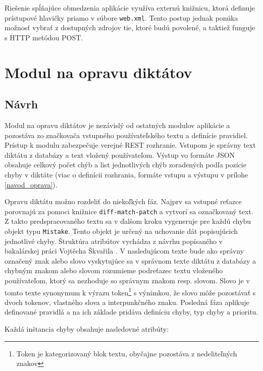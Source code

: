 \documentclass[12pt,oneside]{fithesis2}
\begin{document}
      		\par Riešenie spĺňajúce obmedzenia aplikácie využíva externú knižnicu\cite{dzhuvinov15}, ktorá definuje prístupové hlavičky priamo v súbore \texttt{web.xml}. Tento postup jednak ponúka možnosť vybrať z dostupných zdrojov tie, ktoré budú povolené, a taktiež funguje s HTTP metódou POST\cite{sof2}.
\pagebreak

      \chapter{Modul na opravu diktátov} \label{modul-diktaty}
      
      \section{Návrh}
      \par Modul na opravu diktátov je nezávislý od ostatných modulov aplikácie a pozostáva zo značkovača vstupného používateľského textu a definície pravidiel. Prístup k modulu zabezpečuje verejné REST rozhranie. Vstupom je správny text diktátu z databázy a text vložený používateľom. Výstup vo formáte JSON obsahuje celkový počet chýb a list jednotlivých chýb zoradených podľa pozície chyby v diktáte (viac o definícii rozhrania, formáte vstupu a výstupu v prílohe \ref{navod_oprava}). 
      \par Opravu diktátu možno rozdeliť do niekoľkých fáz. Najprv sa vstupné reťazce porovnajú za pomoci knižnice \texttt{diff-match-patch}\cite{diffmatchpatch} a vytvorí sa označkovaný text. Z takto predspracovaného textu sa v ďalšom kroku vygeneruje pre každú chybu objekt typu \texttt{Mistake}. Tento objekt je určený na uchovanie dát popisujúcich jednotlivé chyby. Štruktúra atribútov vychádza z návrhu popísaného v bakalárskej práci Vojtěcha Škvařila \cite{skvaril14}. V nasledujúcom texte bude ako správny označený znak alebo slovo vyskytujúce sa v správnom texte diktátu z databázy a chybným znakom alebo slovom rozumieme podreťazec textu vloženého používateľom, ktorý sa nezhoduje so správnym znakom resp. slovom. Slovo je v tomto texte synonymum k výrazu token\footnote{Token je kategorizovaný blok textu, obyčajne pozostáva z nedeliteľných znakov} s výnimkou, že slovo môže pozostávať s dvoch tokenov, vlastného slova a interpunkčného znaku. Posledná fáza aplikuje definované pravidlá a na ich základe pridáva definíciu chyby, typ chyby a prioritu.
\par Každá inštancia chyby obsahuje nasledovné atribúty:
\end{document}

